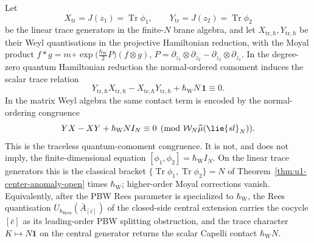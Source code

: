 \documentclass[11pt]{memoir}
\begin{document}
\begin{thm}\label{thm:quantum-classical-anomaly}
  Let
  \[
    X_{\mathrm{tr}}=J(z_1)=\operatorname{Tr}\phi_1,\qquad
    Y_{\mathrm{tr}}=J(z_2)=\operatorname{Tr}\phi_2
  \]
  be the linear trace generators in the finite-\(N\) brane algebra, and
  let \(X_{\mathrm{tr},\hbar},Y_{\mathrm{tr},\hbar}\) be their Weyl
  quantisations in the projective Hamiltonian reduction, with the Moyal product
  \cite{kontsevich-dq}
  $f*g=m\circ\exp\bigl(\tfrac{\hbar_{\mathrm{W}}}{2}P\bigr)(f\otimes g)$,
  $P=\partial_{z_1}\otimes\partial_{z_2}-\partial_{z_2}\otimes\partial_{z_1}$.
  In the degree-zero quantum Hamiltonian reduction the normal-ordered
  comoment induces the scalar trace relation
  \[
    Y_{\mathrm{tr},\hbar}X_{\mathrm{tr},\hbar}
    -X_{\mathrm{tr},\hbar}Y_{\mathrm{tr},\hbar}
    +\hbar_{\mathrm{W}}N\,\mathbf 1\equiv0 .
  \]
  In the matrix Weyl algebra the same contact term is encoded by the
  normal-ordering congruence
  \[
    YX-XY+\hbar_{\mathrm{W}}N I_N\equiv0
    \pmod{\mathcal W_N\widehat\mu(\lie{sl}_N)}.
  \]
  This is the traceless quantum-comoment congruence.  It is not, and
  does not imply, the finite-dimensional equation
  \([\phi_1,\phi_2]=\hbar_{\mathrm{W}} I_N\).  On the linear trace generators this is the
  classical bracket
  $\{\operatorname{Tr}\phi_1,\operatorname{Tr}\phi_2\}=N$ of
  Theorem~\ref{thm:u1-center-anomaly-open} times \(\hbar_{\mathrm{W}}\); higher-order
  Moyal corrections vanish.  Equivalently, after the PBW Rees parameter
  is specialized to \(\hbar_{\mathrm{W}}\), the Rees quantisation
  $U_{\hbar_{\mathrm{Rees}}}(\bar A_{[\bar c]})$ of the closed-side central extension
  carries the cocycle $[\bar c]$ as its leading-order PBW splitting
  obstruction, and the trace character $K\mapsto N\mathbf 1$ on the central
  generator returns the scalar Capelli contact $\hbar_{\mathrm{W}}N$.
\end{thm}
\end{document}
